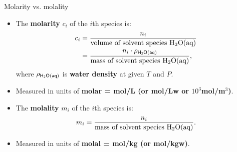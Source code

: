 \begin{frame}{Molarity vs. molality}
%
\lcol
\vskip 20pt
\begin{itemize}
\item The \textbf{molarity} $c_{i}$ of the $i$th species is:
\begin{alignat*}{2}
c_{i} & = \frac{n_{i}}{\text{volume of solvent species H\ensuremath{_{2}}O(aq)}} \\
	& = \frac{n_{i} \cdot \rho_{\sf H{_{2}}O(aq)}}{\text{mass of solvent species H\ensuremath{_{2}}O(aq)}},
\end{alignat*}
where $\rho_{\sf H{_{2}}O(aq)}$ is \textbf{water density} at given $T$ and $P$.
\item Measured in units of {\bf \alert{molar} = mol/L (or mol/Lw or  $10^3$mol/m$^3$)}. 
\end{itemize}
\rcol
\begin{itemize}
\item The \textbf{molality} $m_{i}$ of the $i$th species is:
\[
m_{i}=\frac{n_{i}}{\text{mass of solvent species H\ensuremath{_{2}}O(aq)}}.
\]
\item Measured in units of {\bf \alert{molal} = mol/kg (or mol/kgw)}. 
\end{itemize}
\ecol
\end{frame}
%
%
